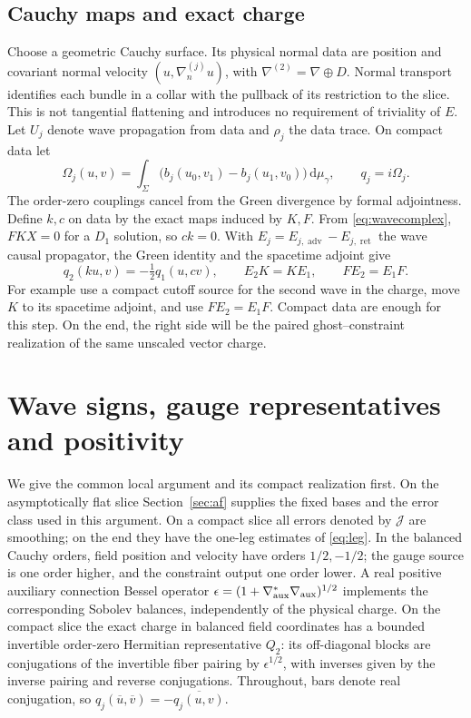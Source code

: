 \documentclass[11pt]{article}
\newcommand{\dd}{\mathrm d}
\newcommand{\Reg}{\mathcal J}
\newcommand{\Ad}{\operatorname{adv}}
\newcommand{\Rt}{\operatorname{ret}}
\begin{document}
\subsection{Cauchy maps and exact charge}\label{sec:charge}

Choose a geometric Cauchy surface. Its physical normal data are position and covariant normal velocity \((u,\nabla_n^{(j)}u)\), with \(\nabla^{(2)}=\nabla\oplus D\). Normal transport identifies each bundle in a collar with the pullback of its restriction to the slice. This is not tangential flattening and introduces no requirement of triviality of \(E\). Let \(U_j\) denote wave propagation from data and \(\rho_j\) the data trace. On compact data let
\[
 \Omega_j(u,v)=\int_\Sigma
 \bigl(b_j(u_0,v_1)-b_j(u_1,v_0)\bigr)\,\dd\mu_\gamma,\qquad
 q_j=i\Omega_j .
\]
The order-zero couplings cancel from the Green divergence by formal adjointness. Define \(k,c\) on data by the exact maps induced by \(K,F\). From \eqref{eq:wavecomplex}, \(FKX=0\) for a \(D_1\) solution, so \(ck=0\). With \(E_j=E_{j,\Ad}-E_{j,\Rt}\) the wave causal propagator, the Green identity and the spacetime adjoint give
\begin{equation}
 q_2(ku,v)=-\tfrac12 q_1(u,cv),\qquad
 E_2K=KE_1,\qquad FE_2=E_1F .
 \label{eq:wd}
\end{equation}
For example use a compact cutoff source for the second wave in the charge, move \(K\) to its spacetime adjoint, and use \(FE_2=E_1F\). Compact data are enough for this step. On the end, the right side will be the paired ghost--constraint realization of the same unscaled vector charge.

\section{Wave signs, gauge representatives and positivity}\label{sec:scheme}

We give the common local argument and its compact realization first. On the asymptotically flat slice Section~\ref{sec:af} supplies the fixed bases and the error class used in this argument. On a compact slice all errors denoted by \(\Reg\) are smoothing; on the end they have the one-leg estimates of \eqref{eq:leg}. In the balanced Cauchy orders, field position and velocity have orders \(1/2,-1/2\); the gauge source is one order higher, and the constraint output one order lower. A real positive auxiliary connection Bessel operator \(\epsilon=(1+\nabla_{\rm aux}^*\nabla_{\rm aux})^{1/2}\) implements the corresponding Sobolev balances, independently of the physical charge. On the compact slice the exact charge in balanced field coordinates has a bounded invertible order-zero Hermitian representative \(Q_2\): its off-diagonal blocks are conjugations of the invertible fiber pairing by \(\epsilon^{1/2}\), with inverses given by the inverse pairing and reverse conjugations. Throughout, bars denote real conjugation, so \(q_j(\overline u,\overline v)=-\overline{q_j(u,v)}\).
\end{document}
